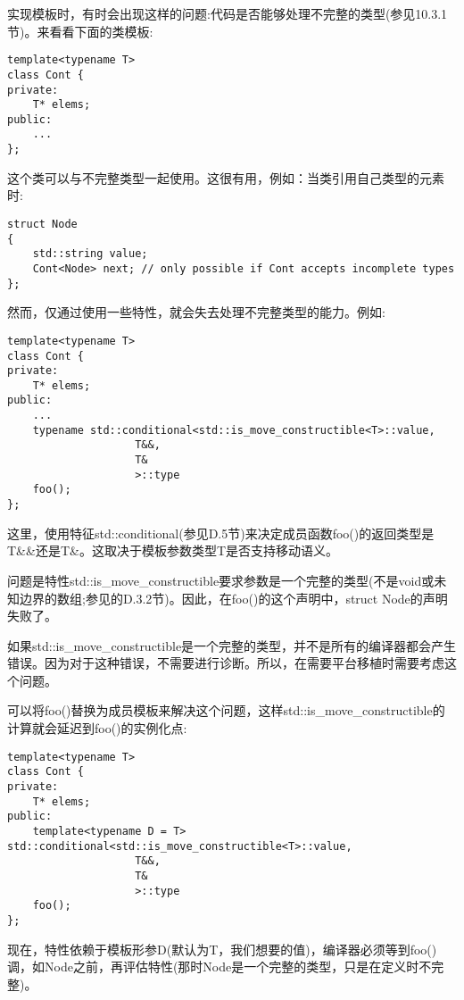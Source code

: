 实现模板时，有时会出现这样的问题:代码是否能够处理不完整的类型(参见10.3.1节)。来看看下面的类模板:

\begin{lstlisting}[style=styleCXX]
template<typename T>
class Cont {
private:
	T* elems;
public:
	...
};
\end{lstlisting}

这个类可以与不完整类型一起使用。这很有用，例如：当类引用自己类型的元素时:

\begin{lstlisting}[style=styleCXX]
struct Node
{
	std::string value;
	Cont<Node> next; // only possible if Cont accepts incomplete types
};
\end{lstlisting}

然而，仅通过使用一些特性，就会失去处理不完整类型的能力。例如:

\begin{lstlisting}[style=styleCXX]
template<typename T>
class Cont {
private:
	T* elems;
public:
	...
	typename std::conditional<std::is_move_constructible<T>::value,
					T&&,
					T&
					>::type
	foo();
};
\end{lstlisting}

这里，使用特征std::conditional(参见D.5节)来决定成员函数foo()的返回类型是T\&\&还是T\&。这取决于模板参数类型T是否支持移动语义。

问题是特性std::is\_move\_constructible要求参数是一个完整的类型(不是void或未知边界的数组;参见的D.3.2节)。因此，在foo()的这个声明中，struct Node的声明失败了。

\begin{tcolorbox}[colback=webgreen!5!white,colframe=webgreen!75!black]
\hspace*{0.75cm}如果std::is\_move\_constructible是一个完整的类型，并不是所有的编译器都会产生错误。因为对于这种错误，不需要进行诊断。所以，在需要平台移植时需要考虑这个问题。
\end{tcolorbox}

可以将foo()替换为成员模板来解决这个问题，这样std::is\_move\_constructible的计算就会延迟到foo()的实例化点:

\begin{lstlisting}[style=styleCXX]
template<typename T>
class Cont {
private:
	T* elems;
public:
	template<typename D = T> std::conditional<std::is_move_constructible<T>::value,
					T&&,
					T&
					>::type
	foo();
};
\end{lstlisting}

现在，特性依赖于模板形参D(默认为T，我们想要的值)，编译器必须等到foo()调，如Node之前，再评估特性(那时Node是一个完整的类型，只是在定义时不完整)。












